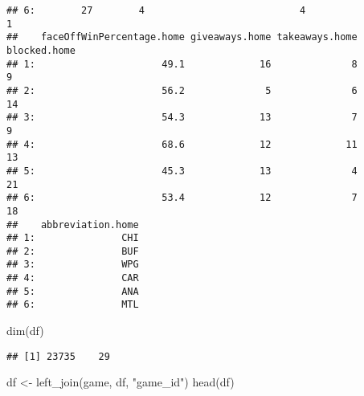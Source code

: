 \documentclass[
]{article}
\newenvironment{Shaded}{\begin{snugshade}}{\end{snugshade}}
\newcommand{\FunctionTok}[1]{\textcolor[rgb]{0.00,0.00,0.00}{#1}}
\newcommand{\NormalTok}[1]{#1}
\newcommand{\OtherTok}[1]{\textcolor[rgb]{0.56,0.35,0.01}{#1}}
\newcommand{\StringTok}[1]{\textcolor[rgb]{0.31,0.60,0.02}{#1}}
\begin{document}
\begin{verbatim}
## 6:        27        4                           4                   1
##    faceOffWinPercentage.home giveaways.home takeaways.home blocked.home
## 1:                      49.1             16              8            9
## 2:                      56.2              5              6           14
## 3:                      54.3             13              7            9
## 4:                      68.6             12             11           13
## 5:                      45.3             13              4           21
## 6:                      53.4             12              7           18
##    abbreviation.home
## 1:               CHI
## 2:               BUF
## 3:               WPG
## 4:               CAR
## 5:               ANA
## 6:               MTL
\end{verbatim}

\begin{Shaded}
\begin{Highlighting}[]
\FunctionTok{dim}\NormalTok{(df)}
\end{Highlighting}
\end{Shaded}

\begin{verbatim}
## [1] 23735    29
\end{verbatim}

\begin{Shaded}
\begin{Highlighting}[]
\NormalTok{df }\OtherTok{\textless{}{-}} \FunctionTok{left\_join}\NormalTok{(game, df, }\StringTok{"game\_id"}\NormalTok{)}
\FunctionTok{head}\NormalTok{(df)}
\end{Highlighting}
\end{Shaded}
\end{document}
